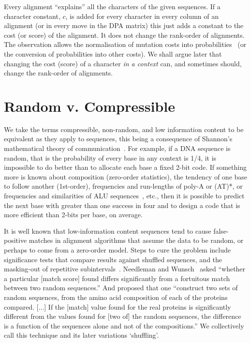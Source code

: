 \documentclass[letterpaper,11pt,oneside]{article}
\begin{document}
Every alignment ``explains'' all the characters of the given sequences.
If a character constant, $c$, is added for every character
in every column of an alignment (or in every move in the DPA matrix)
this just adds a constant to the cost (or score) of the alignment.
It does not change the rank-order of alignments.
The observation allows the normalisation of mutation costs into
probabilities~\cite{allison93a} (or the conversion of probabilities into other costs).
We shall argue later that changing the cost (score) of a character
{\em in a context} can, and sometimes should, change the rank-order
of alignments.


\section{Random v. Compressible}

We take the terms compressible, non-random, and low information content
to be equivalent as they apply to sequences, this being a consequence of
Shannon's mathematical theory of communication~\cite{shannon48}.
For example, if a DNA sequence is random, that is the probability of every
base in any context is 1/4, it is impossible to do better than to allocate
each base a fixed 2-bit code.
If something more is known about composition (zero-order statistics),
the tendency of one base to follow another (1st-order),
frequencies and run-lengths of poly-A or (AT)*, or
frequencies and similarities of ALU sequences~\cite{herzel94}, etc.,
then it is possible to predict the next base with greater than one success
in four and to design a code that is more efficient than 2-bits per base,
on average.

It is well known that low-information content sequences tend to cause
false-positive matches in alignment algorithms that assume
the data to be random, or perhaps to come from a zero-order model.
Steps to cure the problem include
significance tests that compare results against shuffled sequences, and
the masking-out of repetitive subintervals~\cite{wootton93}.
Needleman and Wunsch~\cite{needleman70}
asked ``whether a particular [match score] found differs significantly
from a fortuitous match between two random sequences.''
And proposed that one ``construct two sets of random sequences,
from the amino acid composition of each of the proteins compared. [...]
If the [match] value found for the real proteins is significantly different
from the values found for [two of] the random sequences,
the difference is a function of the sequences alone and
not of the compositions.''
We collectively call this technique and its later variations `shuffling'.
\end{document}
